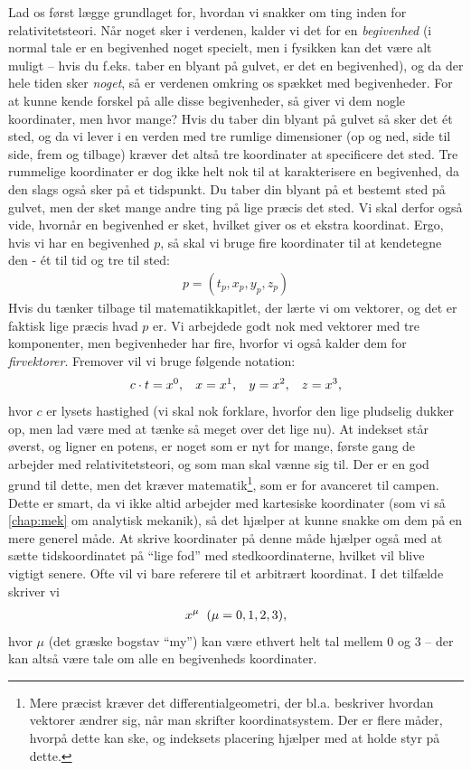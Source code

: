 \documentclass[crop=false, class=memoir]{standalone}
\begin{document}
Lad os først lægge grundlaget for, hvordan vi snakker om ting inden for relativitetsteori. Når noget sker i verdenen, kalder vi det for en \emph{begivenhed} (i normal tale er en begivenhed noget specielt, men i fysikken kan det være alt muligt -- hvis du f.eks. taber en blyant på gulvet, er det en begivenhed), og da der hele tiden sker \emph{noget}, så er verdenen omkring os spækket med begivenheder. For at kunne kende forskel på alle disse begivenheder, så giver vi dem nogle koordinater, men hvor mange? Hvis du taber din blyant på gulvet så sker det ét sted, og da vi lever i en verden med tre rumlige dimensioner (op og ned, side til side, frem og tilbage) kræver det altså tre koordinater at specificere det sted. Tre rummelige koordinater er dog ikke helt nok til at karakterisere en begivenhed, da den slags også sker på et tidspunkt. Du taber din blyant på et bestemt sted på gulvet, men der sket mange andre ting på lige præcis det sted. Vi skal derfor også vide, hvornår en begivenhed er sket, hvilket giver os et ekstra koordinat. Ergo, hvis vi har en begivenhed $p$, så skal vi bruge fire koordinater til at kendetegne den - ét til tid og tre til sted:
%
\begin{align}
    p = (t_p, x_p, y_p, z_p)
\end{align}
%
Hvis du tænker tilbage til matematikkapitlet, der lærte vi om vektorer, og det er faktisk lige præcis hvad $p$ er. Vi arbejdede godt nok med vektorer med tre komponenter, men begivenheder har fire, hvorfor vi også kalder dem for \emph{firvektorer}. Fremover vil vi bruge følgende notation:
%
\begin{align}
    c\cdot t = x^0, \hspace{3mm} x = x^1, \hspace{3mm} y = x^2, \hspace{3mm} z = x^3, \label{rel:eq:four}
\end{align}
%
hvor $c$ er lysets hastighed (vi skal nok forklare, hvorfor den lige pludselig dukker op, men lad være med at tænke så meget over det lige nu). At indekset står øverst, og ligner en potens, er noget som er nyt for mange, første gang de arbejder med relativitetsteori, og som man skal vænne sig til. Der er en god grund til dette, men det kræver matematik\footnote{Mere præcist kræver det differentialgeometri, der bl.a. beskriver hvordan vektorer ændrer sig, når man skrifter koordinatsystem. Der er flere måder, hvorpå dette kan ske, og indeksets placering hjælper med at holde styr på dette.\label{rel:fn:indeks}}, som er for avanceret til campen. Dette er smart, da vi ikke altid arbejder med kartesiske koordinater (som vi så \cref{chap:mek} om analytisk mekanik), så det hjælper at kunne snakke om dem på en mere generel måde. At skrive koordinater på denne måde hjælper også med at sætte tidskoordinatet på ``lige fod'' med stedkoordinaterne, hvilket vil blive vigtigt senere. Ofte vil vi bare referere til et arbitrært koordinat. I det tilfælde skriver vi
%
\begin{align}
    x^{\mu} \hspace{2mm} (\mu = 0,1,2,3),
\end{align}
%
hvor $\mu$ (det græske bogstav ``my'') kan være ethvert helt tal mellem 0 og 3 -- der kan altså være tale om alle en begivenheds koordinater. 
\end{document}
